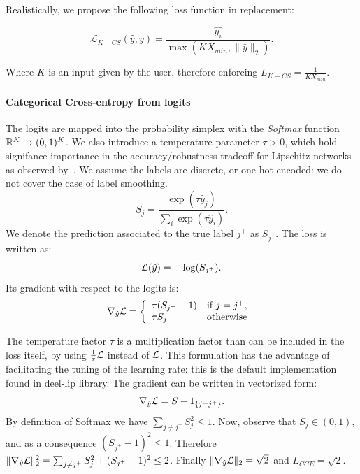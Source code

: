 \noindent Realistically, we propose the following loss function in replacement:

$$\mathcal{L}_{K-CS} (\hat{y},y) = \frac{\hat{y_i}}{\max(KX_{min},\|\hat{y}\|_2)}.$$

\noindent Where $K$ is an input given by the user, therefore enforcing $L_{K-CS} = \frac{1}{KX_{min}}$.

\paragraph{Categorical Cross-entropy from logits} The logits are mapped into the probability simplex with the \textit{Softmax} function $\mathbb{R}^K\rightarrow (0,1)^K$. We also introduce a temperature parameter $\tau>0$, which hold signifance importance in the accuracy/robustness tradeoff for Lipschitz networks as observed by~\cite{bethune2022pay}.  
We assume the labels are discrete, or one-hot encoded: we do not cover the case of label smoothing.  
\begin{equation}
S_{j} = \frac{\exp(\tau \hat y_{j})}{\underset{i}{\sum} \exp(\tau \hat y_{i})}.
\end{equation}
We denote the prediction associated to the true label $j^{+}$ as $S_{j^{+}}$. The loss is written as: 
\begin{equation}
\mathcal{L}(\hat y)  =  -\log(S_{j^{+}}).
\end{equation}
Its gradient with respect to the logits is:
\begin{equation}
\nabla_{\hat y}\mathcal{L} = \left\{\begin{array}{ll}
\tau(S_{j^{+}}-1) & \mbox{if }  j = j^{+}, \\
\tau S_{j} & \mbox{otherwise } 
\end{array}\right.
\end{equation}

The temperature factor $\tau$ is a multiplication factor than can be included in the loss itself, by using $\frac{1}{\tau}\mathcal{L}$ instead of $\mathcal{L}$. This formulation has the advantage of facilitating the tuning of the learning rate: this is the default implementation found in deel-lip library. The gradient can be written in vectorized form:
$$\nabla_{\hat y} \mathcal{L}=S-1_{\{j=j^{+}\}}.$$
 By definition of Softmax we have $\sum_{j\neq j^{+}}S_j^2\leq 1$. Now, observe that $S_j\in (0,1)$, and as a consequence $(S_{j^{+}}-1)^2\leq 1$. Therefore $\|\nabla_{\hat y} \mathcal{L}\|^2_2= \sum_{j\neq j^{+}}S_j^2+(S_{j^{+}}-1)^2\leq 2$.
Finally $\|\nabla_{\hat y} \mathcal{L}\|_2=\sqrt{2}$ and $L_{CCE}=\sqrt{2}$.

